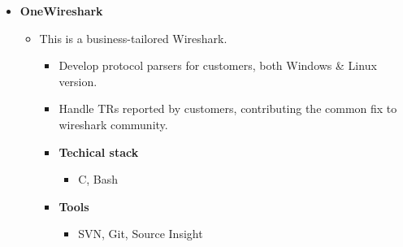 \documentclass[11pt,a4paper,sans]{moderncv}        %
\begin{document}
{\begin{itemize}
\begin{itemize}
        \begin{itemize}
        \item Design and implement the whole application from scratch, cooperating with cross national customers and developers.
        \item \textbf{Techical stack}
            \begin{itemize}
            \item Java, Perl, Bash, Regular Expression
            \end{itemize}
        \item \textbf{Tools}
            \begin{itemize}
            \item Git, Vim, Eclipse
            \end{itemize}
        \end{itemize}
    \end{itemize}
\item \textbf{OneWireshark}
    \begin{itemize}
    \item This is a business-tailored Wireshark.
        \begin{itemize}
            \item Develop protocol parsers for customers, both Windows \& Linux version.
            \item Handle TRs reported by customers, contributing the common fix to wireshark community.
            \item \textbf{Techical stack}
                \begin{itemize}
                \item C, Bash
                \end{itemize}
            \item \textbf{Tools}
                \begin{itemize}
                \item SVN, Git, Source Insight
                \end{itemize}
        \end{itemize}
    \end{itemize}
\end{itemize}}

\clearpage
\end{document}
